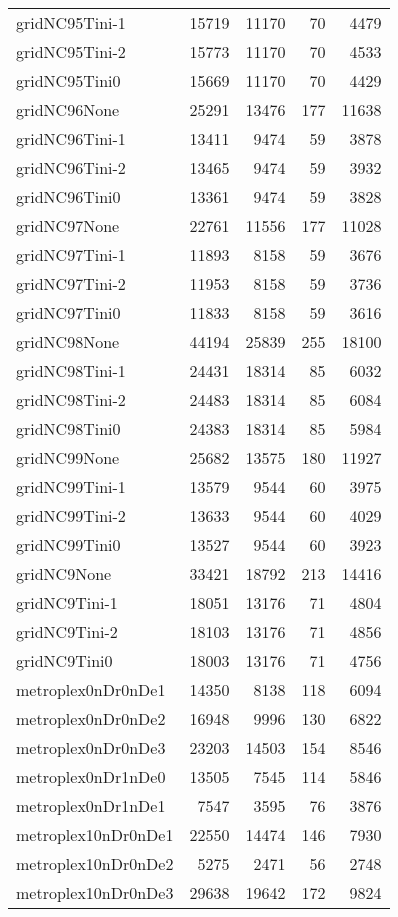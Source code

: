 \begin{longtable}{lrrrr}
gridNC95Tini-1 & 15719 & 11170 & 70 & 4479 \\
gridNC95Tini-2 & 15773 & 11170 & 70 & 4533 \\
gridNC95Tini0 & 15669 & 11170 & 70 & 4429 \\
gridNC96None & 25291 & 13476 & 177 & 11638 \\
gridNC96Tini-1 & 13411 & 9474 & 59 & 3878 \\
gridNC96Tini-2 & 13465 & 9474 & 59 & 3932 \\
gridNC96Tini0 & 13361 & 9474 & 59 & 3828 \\
gridNC97None & 22761 & 11556 & 177 & 11028 \\
gridNC97Tini-1 & 11893 & 8158 & 59 & 3676 \\
gridNC97Tini-2 & 11953 & 8158 & 59 & 3736 \\
gridNC97Tini0 & 11833 & 8158 & 59 & 3616 \\
gridNC98None & 44194 & 25839 & 255 & 18100 \\
gridNC98Tini-1 & 24431 & 18314 & 85 & 6032 \\
gridNC98Tini-2 & 24483 & 18314 & 85 & 6084 \\
gridNC98Tini0 & 24383 & 18314 & 85 & 5984 \\
gridNC99None & 25682 & 13575 & 180 & 11927 \\
gridNC99Tini-1 & 13579 & 9544 & 60 & 3975 \\
gridNC99Tini-2 & 13633 & 9544 & 60 & 4029 \\
gridNC99Tini0 & 13527 & 9544 & 60 & 3923 \\
gridNC9None & 33421 & 18792 & 213 & 14416 \\
gridNC9Tini-1 & 18051 & 13176 & 71 & 4804 \\
gridNC9Tini-2 & 18103 & 13176 & 71 & 4856 \\
gridNC9Tini0 & 18003 & 13176 & 71 & 4756 \\
metroplex0nDr0nDe1 & 14350 & 8138 & 118 & 6094 \\
metroplex0nDr0nDe2 & 16948 & 9996 & 130 & 6822 \\
metroplex0nDr0nDe3 & 23203 & 14503 & 154 & 8546 \\
metroplex0nDr1nDe0 & 13505 & 7545 & 114 & 5846 \\
metroplex0nDr1nDe1 & 7547 & 3595 & 76 & 3876 \\
metroplex10nDr0nDe1 & 22550 & 14474 & 146 & 7930 \\
metroplex10nDr0nDe2 & 5275 & 2471 & 56 & 2748 \\
metroplex10nDr0nDe3 & 29638 & 19642 & 172 & 9824 \\

\end{longtable}
